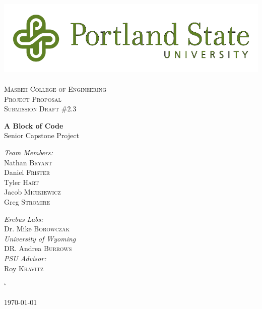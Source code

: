 
\linespread{1.1}

\begin{titlepage}
\begin{center}

\includegraphics[width=.75\textwidth]{./PSU_logo.png}~\\[.5cm]

\textsc{\LARGE \color{PSU} Maseeh College of Engineering}\\[1.5cm]

\textsc{\Large Project Proposal}\\[0.5cm]
\textsc{\Large Submission Draft \#2.3}\\[0.5cm]
\vspace{1cm}

{ \huge \bfseries\color{PSU} A Block of Code\\[0.4cm] }
  \large Senior Capstone Project

\vspace{2.5cm}
 \begin{multicols}{2}

\begin{flushleft}
\noindent
 \large
\emph{\color{PSU}Team Members:}\\
Nathan \textsc{Bryant}\\
Daniel \textsc{Frister}\\
Tyler  \textsc{Hart}\\
Jacob   \textsc{Micikiewicz}\\
Greg    \textsc{Stromire}\\
\end{flushleft}

 \begin{flushleft}
  \large
 \emph{\color{PSU}Erebus Labs:} \\
 Dr. Mike  \textsc{Borowczak}\\
 \emph{\color{PSU}University of Wyoming}\\
 DR. Andrea \textsc{Burrows}\\
 \emph{\color{PSU}PSU Advisor:}\\
 Roy \textsc{Kravitz}
 \end{flushleft}


 \end{multicols}`
\vfill

{\large \today}

\end{center}
\end{titlepage}
 \tableofcontents

